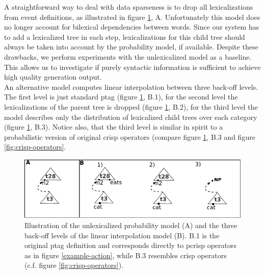   A straightforward way to deal with data sparseness is to drop all lexicalizations from event definitions, as illustrated in figure \ref{fig:modelillustration}, A. Unfortunately this model does no longer account for bilexical dependencies between words. Since our system has to add a lexicalized tree in each step, lexicalizations for this child tree should always be taken into account by the probability model, if available. Despite these drawbacks, we perform experiments with the unlexicalized model as a baseline. This allows us to investigate if purely syntactic information is sufficient to achieve high quality generation output. \\  
An alternative model computes linear interpolation between three back-off levels. The first level is just standard {\sc ptag} (figure \ref{fig:modelillustration}, B.1), for the second level the lexicalizations of the parent tree is dropped (figure \ref{fig:modelillustration}, B.2), for the third level the model describes only the distribution of lexicalized child trees over each category (figure \ref{fig:modelillustration}, B.3).  
Notice also, that the third level is similar in spirit to a probabilistic version of original {\sc crisp} operators (compare figure \ref{fig:modelillustration}, B.3 and figure \ref{fig:crisp-operators}. 
\begin{figure}[t]
\begin{center}
\includegraphics[width=.5\textwidth]{figures/modelillustration}
\caption{\label{fig:modelillustration} Illustration of the unlexicalized probability model (A) and the three back-off levels of the linear interpolation model (B). B.1 is the original {\sc ptag} definition and corresponds directly to {\sc pcrisp} operators as in figure \ref{example-action}, while B.3 resembles {\sc crisp} operators (c.f. figure \ref{fig:crisp-operators}).}

\end{center}
\end{figure}









